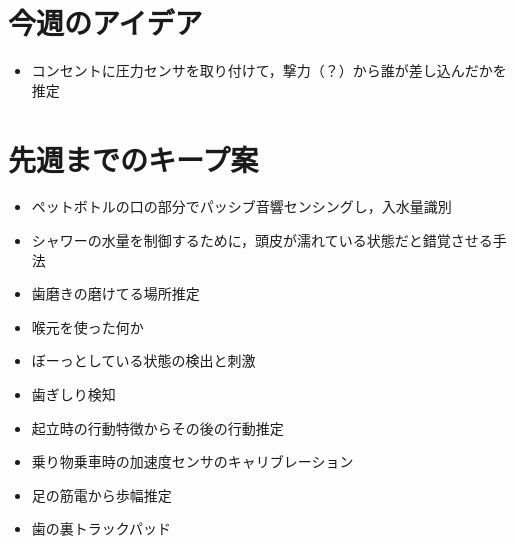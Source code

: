 \documentclass[a4j,10pt]{jarticle}
\begin{document}
\begin{multicols}{2}
  \section{今週のアイデア}
  \begin{itemize}
    \item コンセントに圧力センサを取り付けて，撃力（？）から誰が差し込んだかを推定
  \end{itemize}

  \section{先週までのキープ案}
  \begin{itemize}
    \item ペットボトルの口の部分でパッシブ音響センシングし，入水量識別
    \item シャワーの水量を制御するために，頭皮が濡れている状態だと錯覚させる手法
    \item 歯磨きの磨けてる場所推定
    \item 喉元を使った何か
    \item ぼーっとしている状態の検出と刺激
    \item 歯ぎしり検知
    \item 起立時の行動特徴からその後の行動推定
    \item 乗り物乗車時の加速度センサのキャリブレーション
    \item 足の筋電から歩幅推定
    \item 歯の裏トラックパッド
  \end{itemize}



\end{multicols}
\end{document}
